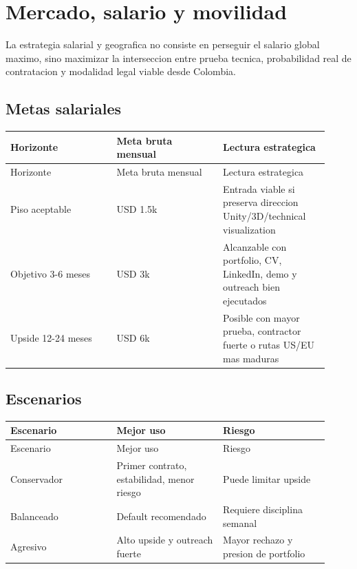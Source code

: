 \chapter{Mercado, salario y movilidad}


La estrategia salarial y geografica no consiste en perseguir el salario global maximo, sino maximizar la interseccion entre prueba tecnica, probabilidad real de contratacion y modalidad legal viable desde Colombia.


\section{Metas salariales}


\begin{center}
\scriptsize
\begin{longtable}{>{\raggedright\arraybackslash}p{0.305\linewidth} >{\raggedright\arraybackslash}p{0.305\linewidth} >{\raggedright\arraybackslash}p{0.305\linewidth}}
\toprule
Horizonte & Meta bruta mensual & Lectura estrategica \\
\midrule
\endfirsthead
\toprule
Horizonte & Meta bruta mensual & Lectura estrategica \\
\midrule
\endhead
Piso aceptable & USD 1.5k & Entrada viable si preserva direccion Unity/3D/technical visualization \\
Objetivo 3-6 meses & USD 3k & Alcanzable con portfolio, CV, LinkedIn, demo y outreach bien ejecutados \\
Upside 12-24 meses & USD 6k & Posible con mayor prueba, contractor fuerte o rutas US/EU mas maduras \\
\bottomrule
\end{longtable}
\end{center}


\section{Escenarios}


\begin{center}
\scriptsize
\begin{longtable}{>{\raggedright\arraybackslash}p{0.305\linewidth} >{\raggedright\arraybackslash}p{0.305\linewidth} >{\raggedright\arraybackslash}p{0.305\linewidth}}
\toprule
Escenario & Mejor uso & Riesgo \\
\midrule
\endfirsthead
\toprule
Escenario & Mejor uso & Riesgo \\
\midrule
\endhead
Conservador & Primer contrato, estabilidad, menor riesgo & Puede limitar upside \\
Balanceado & Default recomendado & Requiere disciplina semanal \\
Agresivo & Alto upside y outreach fuerte & Mayor rechazo y presion de portfolio \\
\bottomrule
\end{longtable}
\end{center}


